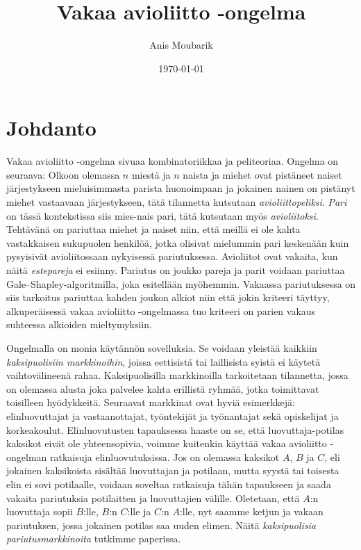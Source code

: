 \documentclass[finnish]{tktltiki2}
\title{Vakaa avioliitto -ongelma}
\author{Anis Moubarik}
\date{\today}
\theoremstyle{definition}
\theoremstyle{remark}
\begin{document}

\maketitle        %
\makeabstract
\tableofcontents  %
\newpage          %



\section{Johdanto}
Vakaa avioliitto -ongelma sivuaa kombinatoriikkaa ja peliteoriaa. Ongelma on seuraava: Olkoon olemassa $n$ miestä ja $n$ naista ja miehet ovat pistäneet naiset järjestykseen mieluisimmasta parista huonoimpaan ja jokainen nainen on pistänyt miehet vastaavaan järjestykseen, tätä tilannetta kutsutaan \emph{avioliittopeliksi}. \emph{Pari} on tässä kontekstissa siis mies-nais pari, tätä kutsutaan myös \emph{avioliitoksi}. Tehtävänä on pariuttaa miehet ja naiset niin, että meillä ei ole kahta vastakkaisen sukupuolen henkilöä, jotka olisivat mielummin pari keskenään kuin pysyisivät avioliitossaan nykyisessä pariutuksessa. Avioliitot ovat vakaita, kun näitä \emph{estepareja} ei esiinny. Pariutus on joukko pareja ja parit voidaan pariuttaa Gale--Shapley-algoritmilla, joka esitellään myöhemmin. Vakaassa pariutuksessa on siis tarkoitus pariuttaa kahden joukon alkiot niin että jokin kriteeri täyttyy, alkuperäisessä vakaa avioliitto -ongelmassa tuo kriteeri on parien vakaus suhteessa alkioiden mieltymyksiin.

Ongelmalla on monia käytännön sovelluksia. Se voidaan yleistää kaikkiin \emph{kaksipuolisiin markkinoihin}, joissa eettisistä tai laillisista syistä ei käytetä vaihtovälineenä rahaa. Kaksipuolisilla markkinoilla tarkoitetaan tilannetta, jossa on olemassa alusta joka palvelee kahta erillistä ryhmää, jotka toimittavat toisilleen hyödykkeitä. Seuraavat markkinat ovat hyviä esimerkkejä: elinluovuttajat ja vastaanottajat, työntekijät ja työnantajat sekä opiskelijat ja korkeakoulut. Elinluovutusten tapauksessa haaste on se, että luovuttaja-potilas kaksikot eivät ole yhteensopivia, voimme kuitenkin käyttää vakaa avioliitto -ongelman ratkaisuja elinluovutuksissa. Jos on olemassa kaksikot $A$, $B$ ja $C$, eli jokainen kaksikoista sisältää luovuttajan ja potilaan, mutta syystä tai toisesta elin ei sovi potilaalle, voidaan soveltaa ratkaisuja tähän tapaukseen ja saada vakaita pariutuksia potilaitten ja luovuttajien välille. Oletetaan, että $A$:n luovuttaja sopii $B$:lle, $B$:n $C$:lle ja $C$:n $A$:lle, nyt saamme ketjun ja vakaan pariutuksen, jossa jokainen potilas saa uuden elimen. Näitä \emph{kaksipuolisia pariutusmarkkinoita} tutkimme paperissa.
\end{document}
